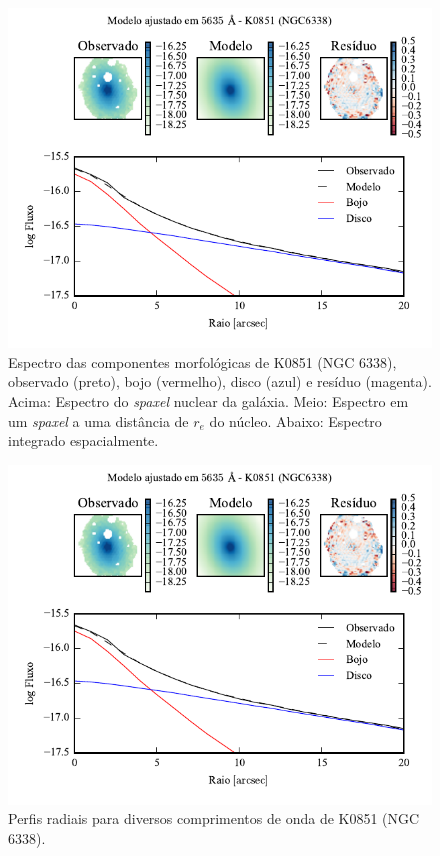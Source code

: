 \begin{figure}
	\includegraphics[page=4]{figuras-decomp/K0851_sample006a}
	\caption[Espectro das componentes morfológicas de K0851 (NGC 6338)]
	{Espectro das componentes morfológicas de K0851 (NGC 6338),
	observado (preto), bojo (vermelho), disco (azul) e resíduo (magenta). Acima:
	Espectro do {\em spaxel} nuclear da galáxia. Meio: Espectro em um {\em spaxel}
	a uma distância de $r_e$ do núcleo. Abaixo: Espectro integrado espacialmente.}
	\label{fig:decompSpectra:K0851}
\end{figure}

\begin{figure}
	\includegraphics[page=5]{figuras-decomp/K0851_sample006a}
	\caption[Perfis radiais para diversos comprimentos de onda de K0851 (NGC 6338)]
	{Perfis radiais para diversos comprimentos de onda de K0851 (NGC 6338).}
	\label{fig:decompRadprofSpec:K0851}
\end{figure}

